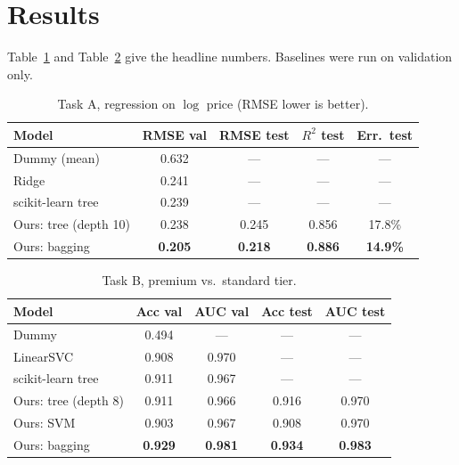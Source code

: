 \section{Results}
Table~\ref{tab:a} and Table~\ref{tab:b} give the headline numbers. Baselines were run on validation only.

\begin{table}[t]
  \centering
  \caption{Task A, regression on $\log$ price (RMSE lower is better).}
  \label{tab:a}
  \footnotesize\setlength{\tabcolsep}{3pt}\begin{tabular}{@{}lcccc@{}}
    \toprule
    Model & RMSE val & RMSE test & $R^2$ test & Err.\ test \\
    \midrule
    Dummy (mean)            & 0.632 & ---   & ---   & --- \\
    Ridge                   & 0.241 & ---   & ---   & --- \\
    scikit-learn tree       & 0.239 & ---   & ---   & --- \\
    Ours: tree (depth 10)   & 0.238 & 0.245 & 0.856 & 17.8\% \\
    Ours: bagging           & \textbf{0.205} & \textbf{0.218} & \textbf{0.886} & \textbf{14.9\%} \\
    \bottomrule
  \end{tabular}
\end{table}

\begin{table}[t]
  \centering
  \caption{Task B, premium vs.\ standard tier.}
  \label{tab:b}
  \footnotesize\setlength{\tabcolsep}{3pt}\begin{tabular}{@{}lcccc@{}}
    \toprule
    Model & Acc val & AUC val & Acc test & AUC test \\
    \midrule
    Dummy                      & 0.494 & ---   & ---   & --- \\
    LinearSVC                  & 0.908 & 0.970 & ---   & --- \\
    scikit-learn tree          & 0.911 & 0.967 & ---   & --- \\
    Ours: tree (depth 8)       & 0.911 & 0.966 & 0.916 & 0.970 \\
    Ours: SVM                  & 0.903 & 0.967 & 0.908 & 0.970 \\
    Ours: bagging              & \textbf{0.929} & \textbf{0.981} & \textbf{0.934} & \textbf{0.983} \\
    \bottomrule
  \end{tabular}
\end{table}

